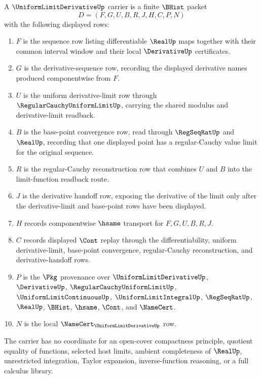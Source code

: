 \begin{definition}
\label{def:uniform-limit-derivative-carrier}
A $\UniformLimitDerivativeUp$ carrier is a finite $\BHist$ packet
$$
D=(F,G,U,B,R,J,H,C,P,N)
$$
with the following displayed rows:
\begin{enumerate}
\item $F$ is the sequence row listing differentiable $\RealUp$ maps together with their common interval window and their local $\DerivativeUp$ certificates.
\item $G$ is the derivative-sequence row, recording the displayed derivative names produced componentwise from $F$.
\item $U$ is the uniform derivative-limit row through $\RegularCauchyUniformLimitUp$, carrying the shared modulus and derivative-limit readback.
\item $B$ is the base-point convergence row, read through $\RegSeqRatUp$ and $\RealUp$, recording that one displayed point has a regular-Cauchy value limit for the original sequence.
\item $R$ is the regular-Cauchy reconstruction row that combines $U$ and $B$ into the limit-function readback route.
\item $J$ is the derivative handoff row, exposing the derivative of the limit only after the derivative-limit and base-point rows have been displayed.
\item $H$ records componentwise $\hsame$ transport for $F,G,U,B,R,J$.
\item $C$ records displayed $\Cont$ replay through the differentiability, uniform derivative-limit, base-point convergence, regular-Cauchy reconstruction, and derivative-handoff rows.
\item $P$ is the $\Pkg$ provenance over $\UniformLimitDerivativeUp$, $\DerivativeUp$, $\RegularCauchyUniformLimitUp$, $\UniformLimitContinuousUp$, $\UniformLimitIntegralUp$, $\RegSeqRatUp$, $\RealUp$, $\BHist$, $\hsame$, $\Cont$, and $\NameCert$.
\item $N$ is the local $\NameCert_{\UniformLimitDerivativeUp}$ row.
\end{enumerate}
The carrier has no coordinate for an open-cover compactness principle, quotient equality of functions, selected host limits, ambient completeness of $\RealUp$, unrestricted integration, Taylor expansion, inverse-function reasoning, or a full calculus library.
\end{definition}

